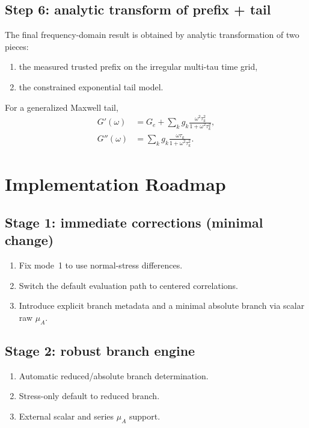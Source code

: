 \documentclass[11pt]{article}
\begin{document}
\subsection{Step 6: analytic transform of prefix + tail}
The final frequency-domain result is obtained by analytic transformation of two pieces:
\begin{enumerate}[leftmargin=2em]
  \item the measured trusted prefix on the irregular multi-tau time grid,
  \item the constrained exponential tail model.
\end{enumerate}
For a generalized Maxwell tail,
\begin{align}
G'(\omega) &= G_e + \sum_k g_k \frac{\omega^2 \tau_k^2}{1+\omega^2\tau_k^2},\\
G''(\omega) &= \sum_k g_k \frac{\omega \tau_k}{1+\omega^2\tau_k^2}.
\end{align}

\section{Implementation Roadmap}

\subsection{Stage 1: immediate corrections (minimal change)}
\begin{enumerate}[leftmargin=2em]
  \item Fix mode~1 to use normal-stress differences.
  \item Switch the default evaluation path to centered correlations.
  \item Introduce explicit branch metadata and a minimal absolute branch via scalar raw $\mu_A$.
\end{enumerate}

\subsection{Stage 2: robust branch engine}
\begin{enumerate}[leftmargin=2em]
  \item Automatic reduced/absolute branch determination.
  \item Stress-only default to reduced branch.
  \item External scalar and series $\mu_A$ support.
\end{enumerate}
\end{document}
